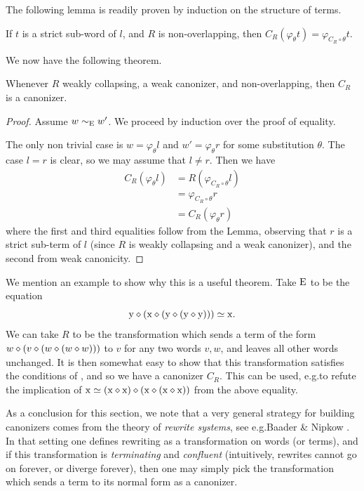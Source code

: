 The following lemma is readily proven by induction on the structure of terms.

\begin{lemma}\label{lem:subsubst}
  If $t$ is a strict sub-word of $l$, and $R$ is non-overlapping, then $C_R(\varphi_\theta t) = \varphi_{C_R\circ \theta} t$.
\end{lemma}
We now have the following theorem.
\begin{theorem}\label{thm:canon}
  Whenever $R$ weakly collapsing, a weak canonizer, and non-overlapping, then $C_R$ is a canonizer.
\end{theorem}
\begin{proof}
  Assume $w\sim_{\mathrm{E}}w'$. We proceed by induction over the proof of equality.

  The only non trivial case is $w = \varphi_\theta l$ and $w'=\varphi_\theta r$ for some substitution $\theta$.  The case $l=r$ is clear, so we may assume that $l \neq r$.
  Then we have
  \begin{align*}
    C_R(\varphi_\theta l) &= R(\varphi_{C_R\circ\theta}l) \\
                 &= \varphi_{C_R\circ\theta}r\\
                 &= C_R(\varphi_\theta r)
  \end{align*}
  where the first and third equalities follow from the Lemma, observing that $r$ is a strict sub-term of $l$ (since $R$ is weakly collapsing and a weak canonizer), and the second from weak canonicity.
\end{proof}

We mention an example to show why this is a useful theorem. Take $\mathrm{E}$ to be the equation
\[
  \mathrm{y} \diamond (\mathrm{x} \diamond (\mathrm{y} \diamond (\mathrm{y} \diamond \mathrm{y})))\simeq \mathrm{x}.
\]
We can take $R$ to be the transformation which sends a term of the form $w \diamond (v \diamond (w \diamond (w \diamond w)))$ to $v$ for any two words $v, w$, and leaves all other words unchanged.
It is then somewhat easy to show that this transformation satisfies the conditions of , and so we have a canonizer $C_R$.
This can be used, e.g.\@ to refute the implication of $\mathrm{x} \simeq (\mathrm{x} \diamond \mathrm{x}) \diamond (\mathrm{x} \diamond (\mathrm{x} \diamond \mathrm{x}))$ from the above equality.

As a conclusion for this section, we note that a very general strategy for building canonizers comes from the theory of \emph{rewrite systems}, see e.g.\@ Baader \& Nipkow \cite{term-rewriting}.
In that setting one defines rewriting as a transformation on words (or terms), and if this transformation is \emph{terminating} and \emph{confluent} (intuitively, rewrites cannot go on forever, or diverge forever), then one may simply pick the transformation which sends a term to its normal form as a canonizer.

